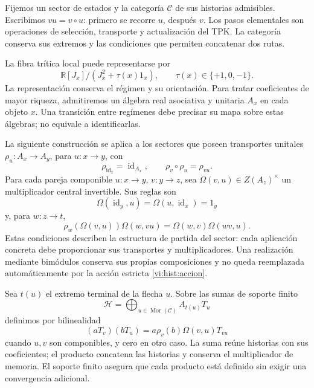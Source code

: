 Fijemos un sector de estados y la categoría \(\mathcal C\) de sus
historias admisibles. Escribimos \(vu=v\circ u\): primero se recorre
\(u\), después \(v\). Los pasos elementales son operaciones de
selección, transporte y actualización del TPK. La categoría conserva
sus extremos y las condiciones que permiten concatenar dos rutas.

La fibra trítica local puede representarse por
\[
 \mathbb R[J_x]/(J_x^2+\tau(x)1_x),
 \qquad \tau(x)\in\{+1,0,-1\}.
\]
La representación conserva el régimen y su orientación. Para tratar
coeficientes de mayor riqueza, admitiremos un álgebra real asociativa y
unitaria \(A_x\) en cada objeto \(x\). Una transición entre regímenes
debe precisar su mapa sobre estas álgebras; no equivale a identificarlas.

La siguiente construcción se aplica a los sectores que poseen transportes
unitales \(\rho_u:A_x\to A_y\), para \(u:x\to y\), con
\begin{equation}
 \rho_{\operatorname{id}_x}=\operatorname{id}_{A_x},\qquad
 \rho_v\circ\rho_u=\rho_{vu}.
 \label{vi:hist:accion}
\end{equation}
Para cada pareja componible \(u:x\to y\), \(v:y\to z\), sea
\(\Omega(v,u)\in Z(A_z)^\times\) un multiplicador central invertible.
Sus reglas son
\begin{equation}
 \Omega(\operatorname{id}_y,u)
 =\Omega(u,\operatorname{id}_x)=1_y
 \label{vi:hist:normalizacion}
\end{equation}
y, para \(w:z\to t\),
\begin{equation}
 \rho_w\!\left(\Omega(v,u)\right)\Omega(w,vu)
 =\Omega(w,v)\Omega(wv,u).
 \label{vi:hist:cociclo}
\end{equation}
Estas condiciones describen la estructura de partida del sector: cada
aplicación concreta debe proporcionar sus transportes y multiplicadores.
Una realización mediante bimódulos conserva sus propias composiciones y
no queda reemplazada automáticamente por la acción estricta
\eqref{vi:hist:accion}.

Sea \(t(u)\) el extremo terminal de la flecha \(u\). Sobre las sumas
de soporte finito
\[
 \mathcal H=\bigoplus_{u\in\operatorname{Mor}(\mathcal C)}A_{t(u)}T_u
\]
definimos por bilinealidad
\begin{equation}
 (aT_v)(bT_u)=
 a\rho_v(b)\Omega(v,u)T_{vu}
 \label{vi:hist:producto}
\end{equation}
cuando \(u,v\) son componibles, y cero en otro caso. La suma reúne
historias con sus coeficientes; el producto concatena las historias y
conserva el multiplicador de memoria. El soporte finito asegura que cada
producto está definido sin exigir una convergencia adicional.

